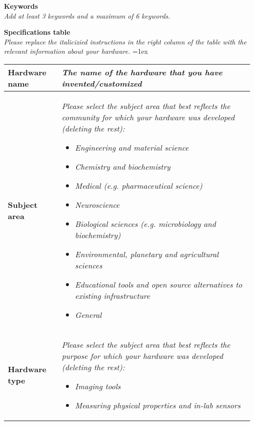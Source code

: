\documentclass[11pt, letterpaper]{article}
\begin{document}
\begin{flushleft}
\textbf{Keywords}\\ \textit{Add at least 3 keywords and a maximum of 6 keywords.}

\newpage
\textbf{Specifications table}\\
\textit{Please replace the italicizied instructions in the right column of the table with the relevant information about your hardware.}
\vskip 0.2cm
\tabulinesep=1ex
\begin{tabu} to \linewidth {|X|X[3,l]|}
\hline  \textbf{Hardware name} & \textit{The name of the hardware that you have invented/customized}
  \\
  \hline \textbf{Subject area} & %
  \textit{Please select the subject area that best reflects the community for which your hardware was developed (deleting the rest):}
  \vskip 0.1cm
  \begin{itemize}[noitemsep, topsep=0pt]
  \item \textit{Engineering and material science}
  \item \textit{Chemistry and biochemistry}
  \item \textit{Medical (e.g. pharmaceutical science)}
  \item \textit{Neuroscience}
  \item \textit{Biological sciences (e.g. microbiology and biochemistry)}
  \item \textit{Environmental, planetary and agricultural sciences}
  \item \textit{Educational tools and open source alternatives to existing infrastructure}
  \item \textit{General}
  \end{itemize}
  \\
  \hline \textbf{Hardware type} &
    \textit{Please select the subject area that best reflects the purpose for which your hardware was developed (deleting the rest):}
  \vskip 0.1cm  
  \begin{itemize}[noitemsep, topsep=0pt]
  \item \textit{Imaging tools}
  \item \textit{Measuring physical properties and in-lab sensors}

\end{itemize}
\end{tabu}
\end{flushleft}
\end{document}
